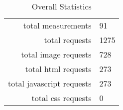 \begin{table}[h]
\caption{Overall Statistics}\centering
\begin{tabular}{rl}
total measurements & 91\\
total requests & 1275\\
total image requests & 728\\
total html requests & 273\\
total javascript requests & 273\\
total css requests & 0\\
\end{tabular}
\end{table}
